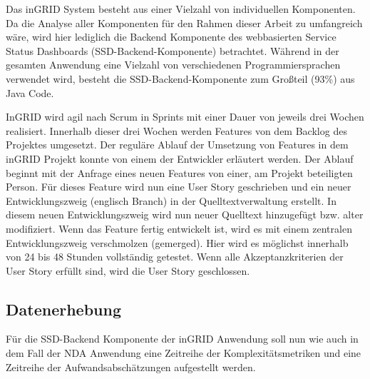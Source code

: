 Das inGRID System besteht aus einer Vielzahl von individuellen
Komponenten. Da die Analyse aller Komponenten für den Rahmen dieser
Arbeit zu umfangreich wäre, wird hier lediglich die Backend Komponente
des webbasierten Service Status Dashboards (SSD-Backend-Komponente)
betrachtet. Während in der gesamten Anwendung eine Vielzahl von
verschiedenen Programmiersprachen verwendet wird, besteht die
SSD-Backend-Komponente zum Großteil (93\%) aus
Java Code.

InGRID wird agil nach Scrum in Sprints mit einer Dauer von jeweils drei
Wochen realisiert. Innerhalb dieser drei Wochen werden Features von dem
Backlog des Projektes umgesetzt. Der reguläre Ablauf der Umsetzung von
Features in dem inGRID Projekt konnte von einem der Entwickler erläutert
werden. Der Ablauf beginnt mit der Anfrage eines neuen Features von
einer, am Projekt beteiligten Person. Für dieses Feature wird nun eine
User Story geschrieben und ein neuer Entwicklungszweig (englisch Branch)
in der Quelltextverwaltung erstellt. In diesem neuen Entwicklungszweig
wird nun neuer Quelltext hinzugefügt bzw. alter modifiziert. Wenn das
Feature fertig entwickelt ist, wird es mit einem zentralen
Entwicklungszweig verschmolzen (gemerged). Hier wird es möglichst
innerhalb von 24 bis 48 Stunden vollständig getestet. Wenn alle
Akzeptanzkriterien der User Story erfüllt sind, wird die User Story
geschlossen.

\subsection{Datenerhebung}\label{ingrid-Datenerhebung}

Für die SSD-Backend Komponente der inGRID Anwendung soll nun wie auch in
dem Fall der \ac{NDA} Anwendung eine Zeitreihe der Komplexitätsmetriken und
eine Zeitreihe der Aufwandsabschätzungen aufgestellt werden.

